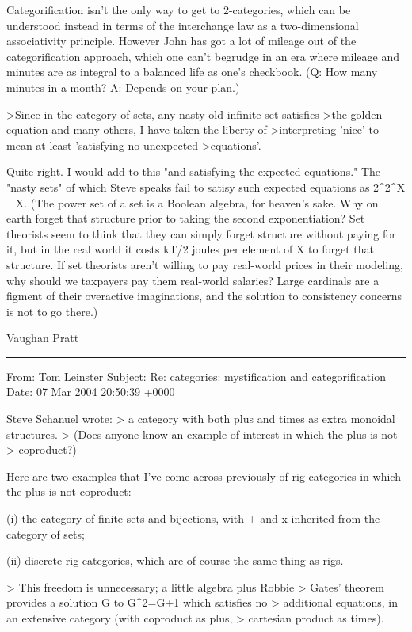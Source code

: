 Categorification isn't the only way to get to 2-categories, which can be
understood instead in terms of the interchange law as a two-dimensional
associativity principle.  However John has got a lot of mileage out of
the categorification approach, which one can't begrudge in an era where
mileage and minutes are as integral to a balanced life as one's checkbook.
(Q: How many minutes in a month?  A: Depends on your plan.)

>Since in the category of sets, any nasty old infinite set satisfies
>the golden equation and many others, I have taken the liberty of
>interpreting 'nice' to mean at least 'satisfying no unexpected
>equations'.

Quite right.  I would add to this "and satisfying the expected equations."
The "nasty sets" of which Steve speaks fail to satisy such expected
equations as 2^2^X ~ X.  (The power set of a set is a Boolean algebra,
for heaven's sake.  Why on earth forget that structure prior to taking the
second exponentiation?  Set theorists seem to think that they can simply
forget structure without paying for it, but in the real world it costs
kT/2 joules per element of X to forget that structure.  If set theorists
aren't willing to pay real-world prices in their modeling, why should we
taxpayers pay them real-world salaries?  Large cardinals are a figment of
their overactive imaginations, and the solution to consistency concerns is
not to go there.)

Vaughan Pratt


\par\noindent\rule{\textwidth}{0.4pt}


From: Tom Leinster 
Subject: Re: categories: mystification and categorification
Date: 07 Mar 2004 20:50:39 +0000

Steve Schanuel wrote:
> a category with both plus and times as extra monoidal structures.
> (Does anyone know an example of interest in which the plus is not
> coproduct?) 

Here are two examples that I've come across previously of rig categories
in which the plus is not coproduct:

(i) the category of finite sets and bijections, with + and x inherited
from the category of sets;

(ii) discrete rig categories, which are of course the same thing as
rigs.

> This freedom is unnecessary; a little algebra plus Robbie
> Gates' theorem provides a solution G to  G^2=G+1 which satisfies no
> additional equations, in an extensive category (with coproduct as plus,
> cartesian product as times).

